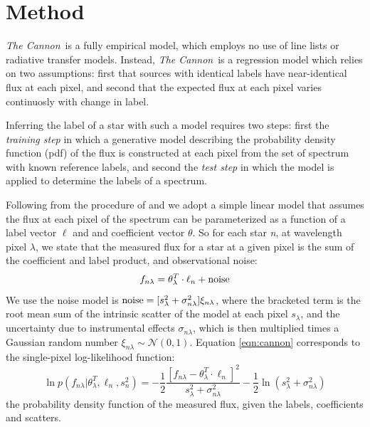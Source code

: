 \documentclass[modern]{aastex62}
\newcommand{\thecannon}{\textsl{The Cannon}}
\begin{document}


\section{Method}\label{sec:cannon}

\thecannon\ is a fully empirical model, which employs no use of line lists or radiative transfer models. Instead, \thecannon\ is a regression model which relies on two assumptions: first that sources with identical labels have near-identical flux at each pixel, and second that the expected flux at each pixel varies continuosly with change in label. 

Inferring the label of a star with such a model requires two steps: first the \emph{training step} in which a generative model describing the probability density function (pdf) of the flux is constructed at each pixel from the set of spectrum with known reference labels, and second the \emph{test step} in which the model is applied to determine the labels of a spectrum.

Following from the procedure of \citealt{Ness:2015} and \citealt{Ho:2017a} we adopt a simple linear model that assumes the flux at each pixel of the spectrum can be parameterized as a function of a label vector $\ell$ and and coefficient vector \emph{$\theta$}. So for each star \emph{n}, at wavelength pixel \emph{$\lambda$}, we state that the measured flux for a star at a given pixel is the sum of the coefficient and label product, and observational noise:
\begin{equation}
	f_{n\lambda} = \theta_{\lambda}^{T} \cdot \ell_{n} + {\rm noise} \label{eqn:cannon}
\end{equation} 
We use the noise model is ${\rm noise}=[s_{\lambda}^2 + \sigma_{n\lambda}^2]\xi_{n\lambda}$, where the bracketed term is the root mean sum of the intrinsic scatter of the model at each pixel \emph{$s_{\lambda}$}, and the uncertainty due to instrumental effects \emph{$\sigma_{n\lambda}$}, which is then multiplied times a Gaussian random number $\xi_{n\lambda} \sim \mathcal{N} (0,1)$. Equation \ref{eqn:cannon} corresponds to the single-pixel log-likelihood function:
\begin{equation}
	\ln p(f_{n\lambda}|\theta^T_{\lambda}, \ell_n, s^2_n) = 
	-\frac{1}{2}\frac{[f_{n\lambda} - \theta_{\lambda}^{T} \cdot \ell_{n}]^2}{s_{\lambda}^2 + \sigma_{n\lambda}^2} - \frac{1}{2} \ln(s_{\lambda}^2 + \sigma_{n\lambda}^2) 
	\label{eqn:likelihood}
\end{equation}
the probability density function of the measured flux, given the labels, coefficients and scatters.
\end{document}
